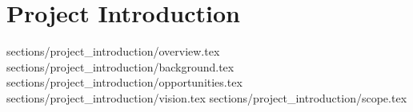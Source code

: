 \chapter{Project Introduction}

 {sections/project_introduction/overview.tex}
 {sections/project_introduction/background.tex}
 {sections/project_introduction/opportunities.tex}
 {sections/project_introduction/vision.tex}
 {sections/project_introduction/scope.tex}

